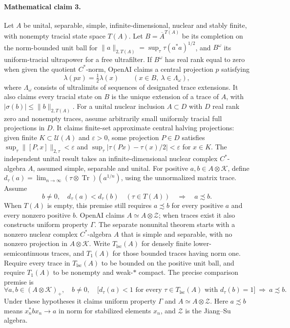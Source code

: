 \documentclass[11pt]{article}
\begin{document}
\paragraph{Mathematical claim 3.} Let $A$ be unital, separable, simple, infinite-dimensional, nuclear and stably finite, with nonempty tracial state space $T(A)$. Let $B=\overline A^{T(A)}$ be its completion on the norm-bounded unit ball for $\|a\|_{2,T(A)}=\sup_\tau\tau(a^*a)^{1/2}$, and $B^\omega$ its uniform-tracial ultrapower for a free ultrafilter. If $B^\omega$ has real rank equal to zero when given the quotient $C^*$-norm, OpenAI claims a central projection $p$ satisfying
\[
\lambda(px)=\tfrac12\lambda(x)\qquad(x\in B,\ \lambda\in\Lambda_\omega),
\]
where $\Lambda_\omega$ consists of ultralimits of sequences of designated trace extensions. It also claims every tracial state on $B$ is the unique extension of a trace of $A$, with $|\sigma(b)|\le\|b\|_{2,T(A)}$.
For a unital nuclear inclusion $A\subset D$ with $D$ real rank zero and nonempty traces, assume arbitrarily small uniformly tracial full projections in $D$. It claims finite-set approximate central halving projections: given finite $K\subset\mathcal U(A)$ and $\varepsilon>0$, some projection $P\in D$ satisfies $\sup_\tau\|[P,x]\|_{2,\tau}<\varepsilon$ and $\sup_\tau|\tau(Px)-\tau(x)/2|<\varepsilon$ for $x\in K$.
The independent unital result takes an infinite-dimensional nuclear complex $C^*$-algebra $A$, assumed simple, separable and unital. For positive $a,b\in A\otimes\mathcal K$, define $d_\tau(a)=\lim_{n\to\infty}(\tau\otimes\operatorname{Tr})(a^{1/n})$, using the unnormalized matrix trace. Assume
\[
b\ne0,\quad d_\tau(a)<d_\tau(b)\quad(\tau\in T(A))\quad\Longrightarrow\quad a\precsim b.
\]
When $T(A)$ is empty, this premise still requires $a\precsim b$ for every positive $a$ and every nonzero positive $b$. OpenAI claims $A\simeq A\otimes\mathcal Z$; when traces exist it also constructs uniform property $\Gamma$.
The separate nonunital theorem starts with a nonzero nuclear complex $C^*$-algebra $A$ that is simple and separable, with no nonzero projection in $A\otimes\mathcal K$. Write $T_{\mathrm{lsc}}(A)$ for densely finite lower-semicontinuous traces, and $T_1(A)$ for those bounded traces having norm one. Require every trace in $T_{\mathrm{lsc}}(A)$ to be bounded on the positive unit ball, and require $T_1(A)$ to be nonempty and weak-$*$ compact. The precise comparison premise is
\[
\forall a,b\in(A\otimes\mathcal K)_+,\quad b\ne0,\quad
\bigl[d_\tau(a)<1\text{ for every }\tau\in T_{\mathrm{lsc}}(A)\text{ with }d_\tau(b)=1\bigr]
\ \Longrightarrow\ a\precsim b.
\]
Under these hypotheses it claims uniform property $\Gamma$ and $A\simeq A\otimes\mathcal Z$. Here $a\precsim b$ means $x_n^*bx_n\to a$ in norm for stabilized elements $x_n$, and $\mathcal Z$ is the Jiang--Su algebra.
\end{document}
